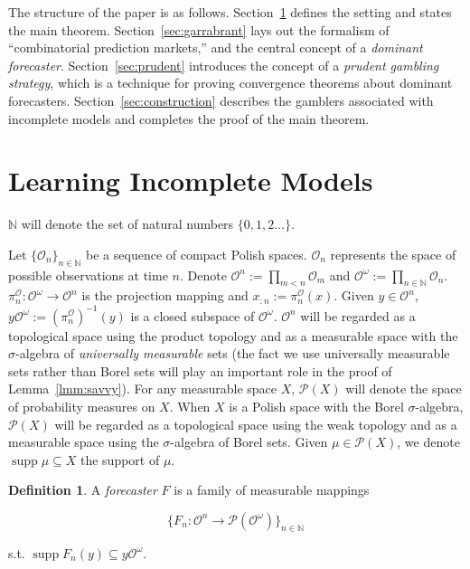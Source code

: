 \documentclass[aop,preprint]{imsart}
\numberwithin{equation}{section}
\theoremstyle{definition}
\newtheorem{definition}{Definition}[section]
\theoremstyle{plain}
\newcommand{\Nats}{\mathbb{N}}
\newcommand{\Sq}[2]{\{#1\}_{#2 \in \Nats}}
\newcommand{\Sqn}[1]{\Sq{#1}{n}}
\newcommand{\PM}{\mathcal{P}}
\DeclareMathOperator{\Sp}{supp}
\newcommand{\Ob}{\mathcal{O}}
\newcommand{\OO}{\Ob^\omega}
\newcommand{\PO}{\pi^\Ob}
\newcommand{\PMO}{\PM(\OO)}
\begin{document}
The structure of the paper is as follows. Section~\ref{sec:learning} defines the setting and states the main theorem. Section~\ref{sec:garrabrant} lays out the formalism of \enquote{combinatorial prediction markets,} and the central concept of a \emph{dominant forecaster}. Section~\ref{sec:prudent} introduces the concept of a \emph{prudent gambling strategy}, which is a technique for proving convergence theorems about dominant forecasters. Section~\ref{sec:construction} describes the gamblers associated with incomplete models and completes the proof of the main theorem.

\section{Learning Incomplete Models}
\label{sec:learning}

$\Nats$ will denote the set of natural numbers $\{0, 1, 2 \ldots\}$.

Let $\Sqn{\Ob_n}$ be a sequence of compact Polish spaces. $\Ob_n$ represents the space of possible observations at time $n$. Denote $\Ob^n := \prod_{m < n} \Ob_m$  and $\Ob^\omega:=\prod_{n \in \Nats} \Ob_n$. $\PO_n: \Ob^\omega \rightarrow \Ob^n$ is the projection mapping and $x_{:n}:=\PO_n\left(x\right)$. Given $y \in \Ob^n$, $y\OO := \left(\PO_n\right)^{-1}\left(y\right)$ is a closed subspace of $\OO$. $\Ob^n$ will be regarded as a topological space using the product topology and as a measurable space with the $\sigma$-algebra of \emph{universally measurable} sets (the fact we use universally measurable sets rather than Borel sets will play an important role in the proof of Lemma~\ref{lmm:savvy}). For any measurable space $X$, $\PM\left(X\right)$ will denote the space of probability measures on $X$. When $X$ is a Polish space with the Borel $\sigma$-algebra, $\PM\left(X\right)$ will be regarded as a topological space using the weak topology and as a measurable space using the $\sigma$-algebra of Borel sets. Given $\mu \in \PM\left(X\right)$, we denote $\Sp \mu \subseteq X$ the support of $\mu$.

\begin{samepage}
\begin{definition}

A \emph{forecaster} $F$ is a family of measurable mappings

\[\Sqn{F_n: \Ob^n \rightarrow \PMO}\]

s.t. $\Sp {F_n\left(y\right)} \subseteq y\OO$.

\end{definition}
\end{samepage}
\end{document}
